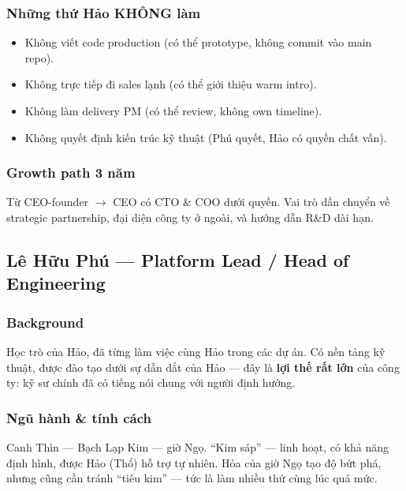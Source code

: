 \documentclass[11pt,a4paper]{article}
\begin{document}
\subsubsection*{Những thứ Hảo KHÔNG làm}
\begin{itemize}
\item Không viết code production (có thể prototype, không commit vào main repo).
\item Không trực tiếp đi sales lạnh (có thể giới thiệu warm intro).
\item Không làm delivery PM (có thể review, không own timeline).
\item Không quyết định kiến trúc kỹ thuật (Phú quyết, Hảo có quyền chất vấn).
\end{itemize}

\subsubsection*{Growth path 3 năm}
Từ CEO-founder $\to$ CEO có CTO \& COO dưới quyền. Vai trò dần chuyển về
strategic partnership, đại diện công ty ở ngoài, và hướng dẫn R\&D dài hạn.

\subsection{Lê Hữu Phú — Platform Lead / Head of Engineering}

\subsubsection*{Background}
Học trò của Hảo, đã từng làm việc cùng Hảo trong các dự án. Có nền tảng kỹ
thuật, được đào tạo dưới sự dẫn dắt của Hảo --- đây là \textbf{lợi thế rất lớn}
của công ty: kỹ sư chính đã có tiếng nói chung với người định hướng.

\subsubsection*{Ngũ hành \& tính cách}
Canh Thìn --- Bạch Lạp Kim --- giờ Ngọ. ``Kim sáp'' --- linh hoạt, có khả năng
định hình, được Hảo (Thổ) hỗ trợ tự nhiên. Hỏa của giờ Ngọ tạo độ bứt phá,
nhưng cũng cần tránh ``tiêu kim'' --- tức là làm nhiều thứ cùng lúc quá mức.
\end{document}

